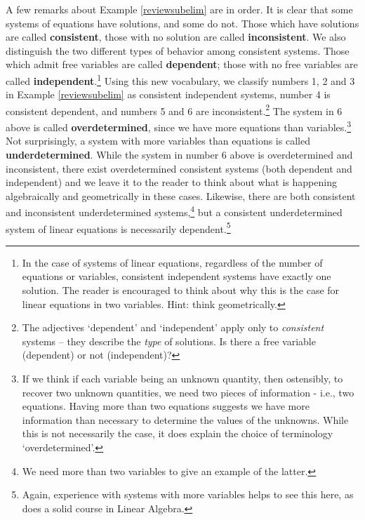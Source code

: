A few remarks about Example \ref{reviewsubelim} are in order.  It is clear that some systems of equations have solutions, and some do not.  Those which have solutions are called   \textbf{consistent}, those with no solution are called   \textbf{inconsistent}. We also distinguish the two different types of behavior among consistent systems. Those which admit free variables are called   \textbf{dependent};  those with no free variables are called   \textbf{independent}.\footnote{In the case of systems of linear equations, regardless of the number of equations or variables, consistent independent systems have exactly one solution.  The reader is encouraged to think about why this is the case for linear equations in two variables.  Hint: think geometrically.}   Using this new vocabulary, we classify numbers 1, 2 and 3 in Example \ref{reviewsubelim} as consistent independent systems, number 4 is consistent dependent, and numbers 5 and 6 are inconsistent.\footnote{The adjectives `dependent' and `independent' apply only to \textit{consistent} systems -- they describe the \textit{type} of solutions.  Is there a free variable (dependent) or not (independent)?}  The system in 6 above is called   \textbf{overdetermined}, since we have more equations  than variables.\footnote{If we think if each variable being an unknown quantity, then ostensibly, to recover two unknown quantities, we need two pieces of information - i.e., two equations.  Having more than two equations suggests we have more information than necessary to determine the values of the unknowns.  While this is not necessarily the case, it does explain the choice of terminology `overdetermined'.}  Not surprisingly, a system with more variables than equations is called   \textbf{underdetermined}.  While the system in number 6 above is overdetermined and inconsistent, there exist overdetermined consistent systems (both dependent and independent) and we leave it to the reader to think about what is happening algebraically and geometrically in these cases.  Likewise, there are both consistent and inconsistent underdetermined systems,\footnote{We need more than two variables to give an example of the latter.} but a consistent underdetermined system of linear equations is necessarily dependent.\footnote{Again, experience with systems with more variables helps to see this here, as does a solid course in Linear Algebra.}  

